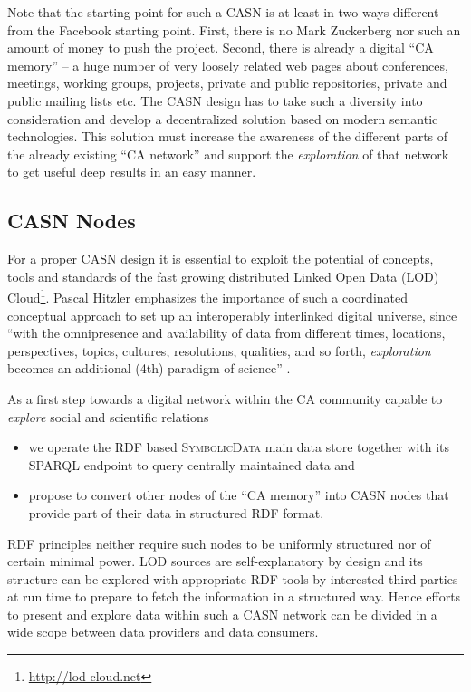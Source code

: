 \documentclass[a4paper,11pt]{article}
\def\SD{\textsc{SymbolicData}}
\begin{document}
Note that the starting point for such a CASN is at least in two ways different
from the Facebook starting point. First, there is no Mark Zuckerberg nor such
an amount of money to push the project. Second, there is already a digital ``CA
memory'' -- a huge number of very loosely related web pages about conferences,
meetings, working groups, projects, private and public repositories, private
and public mailing lists etc. The CASN design has to take such a diversity into
consideration and develop a decentralized solution based on modern semantic
technologies. This solution must increase the awareness of the different parts
of the already existing ``CA network'' and support the \emph{exploration} of
that network to get useful deep results in an easy manner.

\subsection{CASN Nodes}

For a proper CASN design it is essential to exploit the potential of concepts,
tools and standards of the fast growing distributed Linked Open Data (LOD)
Cloud\footnote{ \url{http://lod-cloud.net}}.  Pascal Hitzler emphasizes the
importance of such a coordinated conceptual approach to set up an interoperably
interlinked digital universe, since ``with the omnipresence and availability of
data from different times, locations, perspectives, topics, cultures,
resolutions, qualities, and so forth, \emph{exploration} becomes an additional
(4th) paradigm of science'' \cite{hitzler-13}.

As a first step towards a digital network within the CA community capable
to \emph{explore} social and scientific relations
\begin{itemize}
\item we operate the RDF based {\SD} main data store together with its SPARQL
  endpoint \cite{sdsparql} to query centrally maintained data and
\item propose to convert other nodes of the ``CA memory'' into CASN nodes that
  provide part of their data in structured RDF format.
\end{itemize}
RDF principles neither require such nodes to be uniformly structured nor of
certain minimal power. LOD sources are self-explanatory by design and its
structure can be explored with appropriate RDF tools by interested third
parties at run time to prepare to fetch the information in a structured way.
Hence efforts to present and explore data within such a CASN network can be
divided in a wide scope between data providers and data consumers. 
\end{document}
